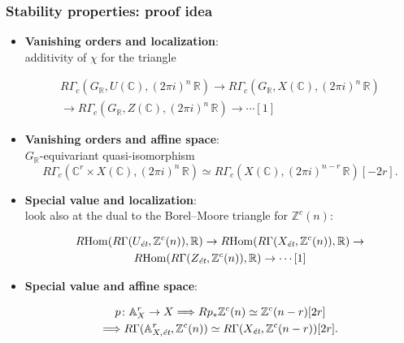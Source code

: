 \documentclass[handout]{beamer}
\newcommand{\ZZ}{\mathbb{Z}}
\newcommand{\RR}{\mathbb{R}}
\newcommand{\CC}{\mathbb{C}}
\renewcommand{\AA}{\mathbb{A}}
\DeclareMathOperator{\Hom}{Hom}
\newcommand{\RHom}{R\!\Hom}
\newcommand{\quiso}{\simeq}
\begin{document}
\begin{frame}
  \frametitle{Stability properties: proof idea}

  \begin{itemize}
  \item<2-> \textbf{Vanishing orders and localization}:\\
    additivity of $\chi$ for the triangle

    \vspace{-2em}

    \begin{multline*}
      R\Gamma_c (G_\RR, U(\CC), (2\pi i)^n\,\RR) \to
      R\Gamma_c (G_\RR, X(\CC), (2\pi i)^n\,\RR) \\
      \to R\Gamma_c (G_\RR, Z(\CC), (2\pi i)^n\,\RR) \to \cdots [1]
    \end{multline*}

  \item<3-> \textbf{Vanishing orders and affine space}:\\
    $G_\RR$-equivariant quasi-isomorphism
    $$R\Gamma_c (\CC^r \times X(\CC), (2\pi i)^n\,\RR) \quiso
    R\Gamma_c (X(\CC), (2\pi i)^{n-r}\,\RR) [-2r].$$

  \item<4-> \textbf{Special value and localization}:\\
    look also at the dual to the Borel--Moore triangle for $\ZZ^c (n)$:

    \vspace{-2em}

    \begin{multline*}
      \RHom(R\Gamma(U_\text{\it ét}, \ZZ^c (n)), \RR) \to
      \RHom(R\Gamma(X_\text{\it ét}, \ZZ^c (n)), \RR) \to\\
      \RHom(R\Gamma(Z_\text{\it ét}, \ZZ^c (n)), \RR) \to \cdots [1]
    \end{multline*}

  \item<5-> \textbf{Special value and affine space}:

    \vspace{-2em}

    \begin{multline*}
      p\colon \AA^r_X \to X \Longrightarrow R p_* \ZZ^c (n) \quiso \ZZ^c (n - r) [2r] \\
      \Longrightarrow R\Gamma (\AA^r_{X,\text{\it ét}}, \ZZ^c (n)) \quiso
      R\Gamma (X_\text{\it ét}, \ZZ^c (n - r)) [2r].
    \end{multline*}

  \end{itemize}
\end{frame}
\end{document}
